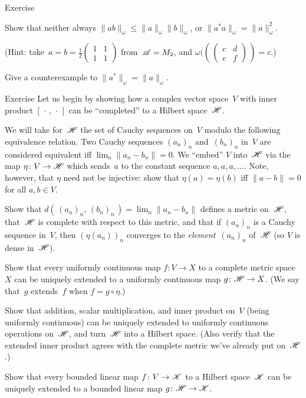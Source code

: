 \documentclass[a]{subfiles}
\begin{document}
\begin{parsec}
\begin{point}{Exercise}
\begin{enumerate}
Show that neither always
$\|ab\|_\omega \leq \|a\|_\omega \|b\|_\omega$,
or
$\|a^*a\|_\omega = \|a\|^2_\omega$.

(Hint: 
take~$a=b=\frac{1}{2}(\begin{smallmatrix}1 & 1 \\ 1 & 1\end{smallmatrix})$
from~$\mathscr{A}= M_2$,
and 
$\omega((\,(\begin{smallmatrix}c&d\\e&f\end{smallmatrix})\,)=c$.)

Give a counterexample to $\|a^*\|_\omega = \|a\|_\omega$.
\end{enumerate}
\end{point}
\begin{point}{Exercise}%
Let us begin by showing how a complex vector space~$V$
with inner product
$[\,\cdot\,,\,\cdot\,]$ can be ``completed'' to a Hilbert space~$\mathscr{H}$.

We will take for~$\mathscr{H}$ the set of Cauchy sequences on~$V$
modulo the following equivalence relation.
Two Cauchy sequences $(a_n)_n$ and~$(b_n)_n$ in~$V$
are considered equivalent
iff $\lim_n \|a_n-b_n\|=0$.
We ``embed'' $V$ into~$\mathscr{H}$ via the map $\eta\colon V\to \mathscr{H}$
which sends~$a$ to
the constant sequence $a,a,a,\dotsc$.
Note, however, that $\eta$ need not be injective:
show that $\eta(a)=\eta(b)$ iff $\|a-b\|=0$ for all $a,b\in V$.

Show that $d(\,(a_n)_n,\,(b_n)_n\,) = \lim_n \|a_n-b_n\|$
defines a metric on~$\mathscr{H}$,
that~$\mathscr{H}$ is complete with respect to this metric,
and that if $(a_n)_n$ is a Cauchy sequence in~$V$,
then $(\eta(a_n))_n$ converges to the \emph{element}~$(a_n)_n$ of~$\mathscr{H}$
(so $V$ is dense in~$\mathscr{H}$).

Show that every uniformly continuous 
map $f\colon V\to X$ to a complete metric space~$X$
can be uniquely extended to a uniformly continuous map $g\colon \mathscr{H}\to X$.
(We say that~$g$ extends~$f$ when $f=g\circ \eta$.)

Show that addition, scalar multiplication, and inner product on~$V$
(being uniformly continuous)
can be uniquely extended to uniformly continuous operations on~$\mathscr{H}$,
and turn~$\mathscr{H}$ into a Hilbert space.
(Also verify that the extended inner product agrees with the complete
metric we've already put on~$\mathscr{H}$.)

Show that every bounded linear map $f\colon V\to\mathscr{K}$
to a Hilbert space~$\mathscr{K}$
can be uniquely extended to a bounded linear map $g\colon \mathscr{H}\to\mathscr{K}$.


\end{point}
\end{parsec}
\end{document}
